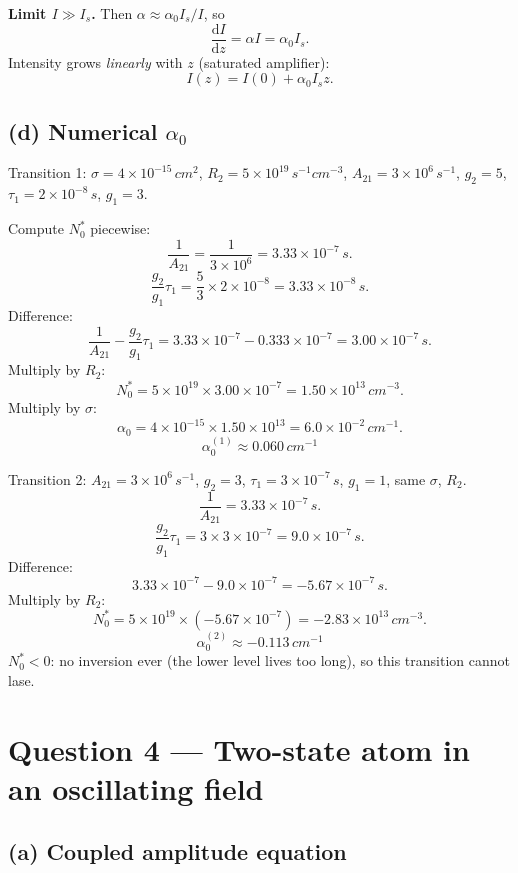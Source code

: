 \documentclass[11pt]{article}
\newcommand{\de}{\mathrm{d}}
\begin{document}
\textbf{Limit $I\gg I_{s}$.} Then $\alpha\approx \alpha_{0}I_{s}/I$, so
\[
\frac{\de I}{\de z}=\alpha I=\alpha_{0}I_{s}.
\]
Intensity grows \emph{linearly} with $z$ (saturated amplifier):
\[
I(z)=I(0)+\alpha_{0}I_{s}z.
\]

\subsection*{(d) Numerical \texorpdfstring{$\alpha_{0}$}{alpha0}}

Transition 1: $\sigma=4\times 10^{-15}\,\si{cm^{2}}$, $R_{2}=5\times 10^{19}\,\si{s^{-1}cm^{-3}}$, $A_{21}=3\times 10^{6}\,\si{s^{-1}}$, $g_{2}=5$, $\tau_{1}=2\times 10^{-8}\,\si{s}$, $g_{1}=3$.

Compute $N^{*}_{0}$ piecewise:
\[
\frac{1}{A_{21}}=\frac{1}{3\times 10^{6}}=3.33\times 10^{-7}\,\si{s}.
\]
\[
\frac{g_{2}}{g_{1}}\tau_{1}=\frac{5}{3}\times 2\times 10^{-8}=3.33\times 10^{-8}\,\si{s}.
\]
Difference:
\[
\frac{1}{A_{21}}-\frac{g_{2}}{g_{1}}\tau_{1}=3.33\times 10^{-7}-0.333\times 10^{-7}=3.00\times 10^{-7}\,\si{s}.
\]
Multiply by $R_{2}$:
\[
N^{*}_{0}=5\times 10^{19}\times 3.00\times 10^{-7}=1.50\times 10^{13}\,\si{cm^{-3}}.
\]
Multiply by $\sigma$:
\[
\alpha_{0}=4\times 10^{-15}\times 1.50\times 10^{13}=6.0\times 10^{-2}\,\si{cm^{-1}}.
\]
\[
\boxed{\;\alpha_{0}^{(1)}\approx 0.060\,\si{cm^{-1}}\;}
\]

Transition 2: $A_{21}=3\times 10^{6}\,\si{s^{-1}}$, $g_{2}=3$, $\tau_{1}=3\times 10^{-7}\,\si{s}$, $g_{1}=1$, same $\sigma$, $R_{2}$.
\[
\frac{1}{A_{21}}=3.33\times 10^{-7}\,\si{s}.
\]
\[
\frac{g_{2}}{g_{1}}\tau_{1}=3\times 3\times 10^{-7}=9.0\times 10^{-7}\,\si{s}.
\]
Difference:
\[
3.33\times 10^{-7}-9.0\times 10^{-7}=-5.67\times 10^{-7}\,\si{s}.
\]
Multiply by $R_{2}$:
\[
N^{*}_{0}=5\times 10^{19}\times(-5.67\times 10^{-7})=-2.83\times 10^{13}\,\si{cm^{-3}}.
\]
\[
\boxed{\;\alpha_{0}^{(2)}\approx -0.113\,\si{cm^{-1}}\;}
\]
$N^{*}_{0}<0$: no inversion ever (the lower level lives too long), so this transition cannot lase.

\section*{Question 4 --- Two-state atom in an oscillating field}

\subsection*{(a) Coupled amplitude equation}
\end{document}
